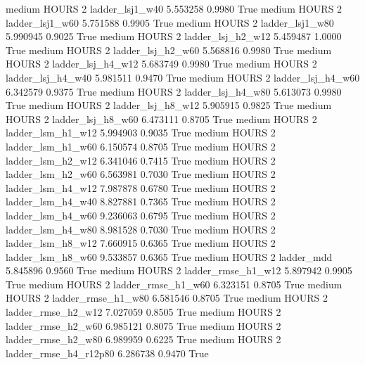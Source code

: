     medium    HOURS                 2        ladder_lsj1_w40   5.553258      0.9980    True
    medium    HOURS                 2        ladder_lsj1_w60   5.751588      0.9905    True
    medium    HOURS                 2        ladder_lsj1_w80   5.990945      0.9025    True
    medium    HOURS                 2      ladder_lsj_h2_w12   5.459487      1.0000    True
    medium    HOURS                 2      ladder_lsj_h2_w60   5.568816      0.9980    True
    medium    HOURS                 2      ladder_lsj_h4_w12   5.683749      0.9980    True
    medium    HOURS                 2      ladder_lsj_h4_w40   5.981511      0.9470    True
    medium    HOURS                 2      ladder_lsj_h4_w60   6.342579      0.9375    True
    medium    HOURS                 2      ladder_lsj_h4_w80   5.613073      0.9980    True
    medium    HOURS                 2      ladder_lsj_h8_w12   5.905915      0.9825    True
    medium    HOURS                 2      ladder_lsj_h8_w60   6.473111      0.8705    True
    medium    HOURS                 2      ladder_lsm_h1_w12   5.994903      0.9035    True
    medium    HOURS                 2      ladder_lsm_h1_w60   6.150574      0.8705    True
    medium    HOURS                 2      ladder_lsm_h2_w12   6.341046      0.7415    True
    medium    HOURS                 2      ladder_lsm_h2_w60   6.563981      0.7030    True
    medium    HOURS                 2      ladder_lsm_h4_w12   7.987878      0.6780    True
    medium    HOURS                 2      ladder_lsm_h4_w40   8.827881      0.7365    True
    medium    HOURS                 2      ladder_lsm_h4_w60   9.236063      0.6795    True
    medium    HOURS                 2      ladder_lsm_h4_w80   8.981528      0.7030    True
    medium    HOURS                 2      ladder_lsm_h8_w12   7.660915      0.6365    True
    medium    HOURS                 2      ladder_lsm_h8_w60   9.533857      0.6365    True
    medium    HOURS                 2             ladder_mdd   5.845896      0.9560    True
    medium    HOURS                 2     ladder_rmse_h1_w12   5.897942      0.9905    True
    medium    HOURS                 2     ladder_rmse_h1_w60   6.323151      0.8705    True
    medium    HOURS                 2     ladder_rmse_h1_w80   6.581546      0.8705    True
    medium    HOURS                 2     ladder_rmse_h2_w12   7.027059      0.8505    True
    medium    HOURS                 2     ladder_rmse_h2_w60   6.985121      0.8075    True
    medium    HOURS                 2     ladder_rmse_h2_w80   6.989959      0.6225    True
    medium    HOURS                 2  ladder_rmse_h4_r12p80   6.286738      0.9470    True
